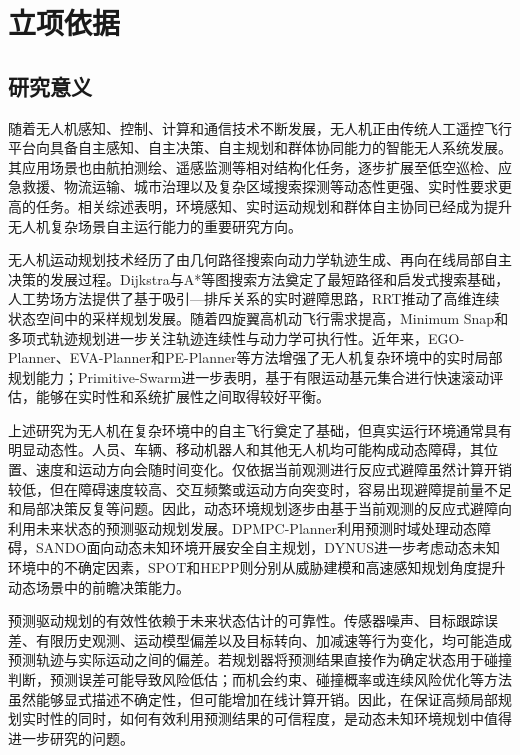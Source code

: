 \chapter{立项依据}

\section{研究意义}

随着无人机感知、控制、计算和通信技术不断发展，无人机正由传统人工遥控飞行平台向具备自主感知、自主决策、自主规划和群体协同能力的智能无人系统发展。其应用场景也由航拍测绘、遥感监测等相对结构化任务，逐步扩展至低空巡检、应急救援、物流运输、城市治理以及复杂区域搜索探测等动态性更强、实时性要求更高的任务。相关综述表明，环境感知、实时运动规划和群体自主协同已经成为提升无人机复杂场景自主运行能力的重要研究方向\cite{nie2025review,arshid2025review}。

无人机运动规划技术经历了由几何路径搜索向动力学轨迹生成、再向在线局部自主决策的发展过程。Dijkstra\cite{dijkstra1959}与A*\cite{hart1968astar}等图搜索方法奠定了最短路径和启发式搜索基础，人工势场方法\cite{khatib1986apf}提供了基于吸引—排斥关系的实时避障思路，RRT\cite{lavalle1998rrt}推动了高维连续状态空间中的采样规划发展。随着四旋翼高机动飞行需求提高，Minimum Snap\cite{mellinger2011minimumsnap}和多项式轨迹规划\cite{richter2016polynomial}进一步关注轨迹连续性与动力学可执行性。近年来，EGO-Planner\cite{egoPlanner}、EVA-Planner\cite{evaPlanner}和PE-Planner\cite{pePlanner}等方法增强了无人机复杂环境中的实时局部规划能力；Primitive-Swarm\cite{primitiveSwarm}进一步表明，基于有限运动基元集合进行快速滚动评估，能够在实时性和系统扩展性之间取得较好平衡。

上述研究为无人机在复杂环境中的自主飞行奠定了基础，但真实运行环境通常具有明显动态性。人员、车辆、移动机器人和其他无人机均可能构成动态障碍，其位置、速度和运动方向会随时间变化。仅依据当前观测进行反应式避障虽然计算开销较低，但在障碍速度较高、交互频繁或运动方向突变时，容易出现避障提前量不足和局部决策反复等问题。因此，动态环境规划逐步由基于当前观测的反应式避障向利用未来状态的预测驱动规划发展。DPMPC-Planner\cite{dpmpc}利用预测时域处理动态障碍，SANDO\cite{sando}面向动态未知环境开展安全自主规划，DYNUS\cite{dynus}进一步考虑动态未知环境中的不确定因素，SPOT\cite{spot}和HEPP\cite{hepp}则分别从威胁建模和高速感知规划角度提升动态场景中的前瞻决策能力。

预测驱动规划的有效性依赖于未来状态估计的可靠性。传感器噪声、目标跟踪误差、有限历史观测、运动模型偏差以及目标转向、加减速等行为变化，均可能造成预测轨迹与实际运动之间的偏差。若规划器将预测结果直接作为确定状态用于碰撞判断，预测误差可能导致风险低估；而机会约束、碰撞概率或连续风险优化等方法虽然能够显式描述不确定性，但可能增加在线计算开销。因此，在保证高频局部规划实时性的同时，如何有效利用预测结果的可信程度，是动态未知环境规划中值得进一步研究的问题。


